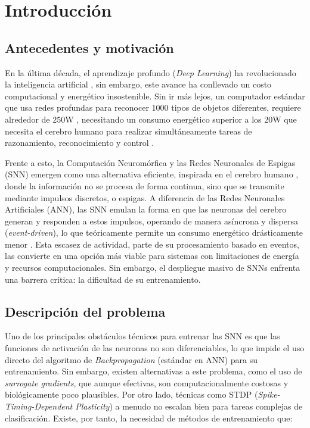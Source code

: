 \chapter{Introducción}\label{cap:intro}

\section{Antecedentes y motivación}
En la última década, el aprendizaje profundo (\textit{Deep Learning}) ha revolucionado la inteligencia artificial \cite{dean2022golden}, sin embargo, este avance ha conllevado un costo computacional y energético insostenible. Sin ir más lejos, un computador estándar que usa redes profundas para reconocer 1000 tipos de objetos diferentes, requiere alrededor de 250W \cite{roy2019spike}, necesitando un consumo energético superior a los 20W que necesita el cerebro humano para realizar simultáneamente tareas de razonamiento, reconocimiento y control \cite{roy2019spike}.

Frente a esto, la Computación Neuromórfica y las Redes Neuronales de Espigas (SNN) emergen como una alternativa eficiente, inspirada en el cerebro humano \cite{Schuman2022Opportunities}, donde la información no se procesa de forma continua, sino que se transmite mediante impulsos discretos, o espigas. A diferencia de las Redes Neuronales Artificiales (ANN), las SNN emulan la forma en que las neuronas del cerebro generan y responden a estos impulsos, operando de manera asíncrona y dispersa (\textit{event-driven}), lo que teóricamente permite un consumo energético drásticamente menor \cite{Schuman2022Opportunities}. Esta escasez de actividad, parte de su procesamiento basado en eventos, las convierte en una opción más viable para sistemas con limitaciones de energía y recursos computacionales. Sin embargo, el despliegue masivo de SNNs enfrenta una barrera crítica: la dificultad de su entrenamiento.


\section{Descripción del problema}
Uno de los principales obstáculos técnicos para entrenar las SNN es que las funciones de activación de las neuronas no son diferenciables, lo que impide el uso directo del algoritmo de \textit{Backpropagation} (estándar en ANN) para su entrenamiento. Sin embargo, existen alternativas a este problema, como el uso de \textit{surrogate gradients}, que aunque efectivas, son computacionalmente costosas y biológicamente poco plausibles. Por otro lado, técnicas como STDP (\textit{Spike-Timing-Dependent Plasticity}) a menudo no escalan bien para tareas complejas de clasificación. Existe, por tanto, la necesidad de métodos de entrenamiento que:


